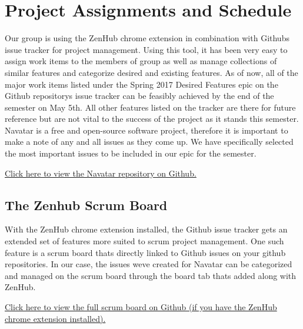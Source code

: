 \documentclass{scrreprt}
\begin{document}
\chapter{Project Assignments and Schedule}
Our group is using the ZenHub chrome extension in combination with Github\textsc{}s issue tracker for project management. Using this tool, it has been very easy to assign work items to the members of group as well as manage collections of similar features and categorize desired and existing features. As of now, all of the major work items listed under the \textsc{}Spring 2017 Desired Features\textsc{} epic on the Github repository\textsc{}s issue tracker can be feasibly achieved by the end of the semester on May 5th. All other features listed on the tracker are there for future reference but are not vital to the success of the project as it stands this semester. Navatar is a free and open-source software project, therefore it is important to make a note of any and all issues as they come up. We have specifically selected the most important issues to be included in our epic for the semester.

\href{https://github.com/matthewjberger/navatar/}{Click here to view the Navatar repository on Github.}

\pagebreak

\section{The Zenhub Scrum Board}

With the ZenHub chrome extension installed, the Github issue tracker gets an extended set of features more suited to scrum project management. One such feature is a scrum board that\textsc{}s directly linked to Github issues on your github repositories. In our case, the issues we\textsc{}ve created for Navatar can be categorized and managed on the scrum board through the \textsc{}board\textsc{} tab that\textsc{}s added along with ZenHub.

\href{https://github.com/matthewjberger/navatar/issues\#boards?repos=80390803}{Click here to view the full scrum board on Github (if you have the ZenHub chrome extension installed).}
\end{document}
